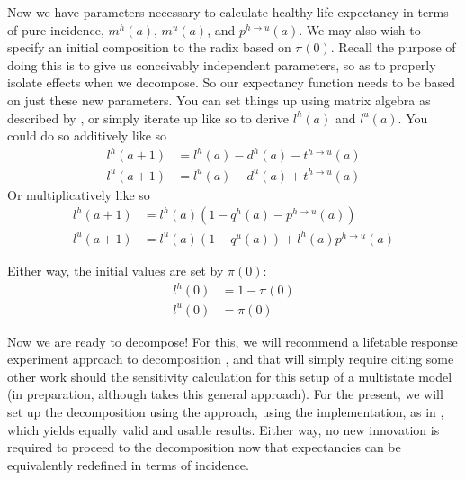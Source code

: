 \documentclass[sn-apa]{sn-jnl}%
\theoremstyle{thmstyleone}%
\theoremstyle{thmstyletwo}%
\theoremstyle{thmstylethree}%
\begin{document}
Now we have parameters necessary to calculate healthy life expectancy in terms of pure incidence, $m^h(a)$, $m^u(a)$, and $p^{h\rightarrow u}(a)$. We may also wish to specify an initial composition to the radix based on $\pi(0)$. Recall the purpose of doing this is to give us conceivably independent parameters, so as to properly isolate effects when we decompose. So our expectancy function needs to be based on just these new parameters. You can set things up using matrix algebra as described by \citet{caswell2021healthy}, or simply iterate up like so to derive $l^h(a)$ and $l^u(a)$. You could do so additively like so
\begin{equation}
\begin{aligned}
l^h(a+1) &= l^h(a) - d^h(a) - t^{h\rightarrow u}(a) \\
l^u(a+1) &= l^u(a) - d^u(a) + t^{h\rightarrow u}(a)
\end{aligned}
\end{equation}
Or multiplicatively like so
\begin{equation}
\begin{aligned}
l^h(a+1) &= l^h(a)  \left(1 - q^h(a) - p^{h\rightarrow u}(a)\right) \\
l^u(a+1) &= l^u(a)  \left(1 - q^u(a)\right) + l^h(a) p^{h\rightarrow u}(a)
\end{aligned}
\end{equation}

Either way, the initial values are set by $\pi(0)$:
\begin{equation}
\begin{aligned}
l^h(0) &= 1-\pi(0) \\
l^u(0) &= \pi(0)
\end{aligned}
\end{equation}

Now we are ready to decompose! For this, we will recommend a lifetable response experiment approach to decomposition \citep{caswell1989analysis}, and that will simply require citing some other work should the sensitivity calculation for this setup of a multistate model (in preparation, although \citet{shen2023decomposition} takes this general approach). For the present, we will set up the decomposition using the \citet{horiuchi2008decomposition} approach, using the \citet{DemoDecomp} implementation, as in \citet{moretti2023multistate}, which yields equally valid and usable results. Either way, no new innovation is required to proceed to the decomposition now that expectancies can be equivalently redefined in terms of incidence. 
\end{document}
